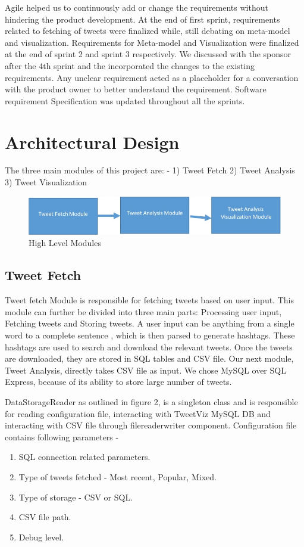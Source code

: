 \documentclass[11pt]{article}
\begin{document}
Agile helped us to continuously add or change the requirements without hindering the product development. At the end of first sprint, requirements related to fetching of tweets were finalized while, still debating on meta-model and visualization. Requirements for Meta-model and Visualization were finalized at the end of sprint 2 and sprint 3 respectively. We discussed with the sponsor after the 4th sprint and the incorporated the changes to the existing requirements. Any unclear requirement acted as a placeholder for a conversation with the product owner to better understand the requirement. Software requirement Specification was updated throughout all the sprints.

\section{Architectural Design}
The three main modules of this project are: - 1) Tweet Fetch 2) Tweet Analysis 3) Tweet Visualization

\begin{figure}[h]
\centering
\includegraphics[width=\textwidth]{HighLevelDesign.jpg}
\caption{High Level Modules}
\end{figure}
\subsection{Tweet Fetch}
Tweet fetch Module is responsible for fetching tweets based on user input. This module can further be divided into three main parts: Processing user input, Fetching tweets and Storing tweets. A user input can be anything from a single word to a complete sentence , which is then parsed to generate hashtags. These hashtags are used to search and download the relevant tweets. Once the tweets are downloaded, they are stored in SQL tables and CSV file. Our next module, Tweet Analysis, directly takes CSV file as input. We chose MySQL over SQL Express, because of its ability to store large number of tweets.

DataStorageReader as outlined in figure 2, is a singleton class and is responsible for reading configuration file, interacting with TweetViz MySQL DB and interacting with CSV file through filereaderwriter component. Configuration file contains following parameters - 
\begin{enumerate}
\item SQL connection related parameters.
\item Type of tweets fetched - Most recent, Popular, Mixed.
\item Type of storage - CSV or SQL.
\item CSV file path.
\item Debug level.  
\end{enumerate}
\end{document}
